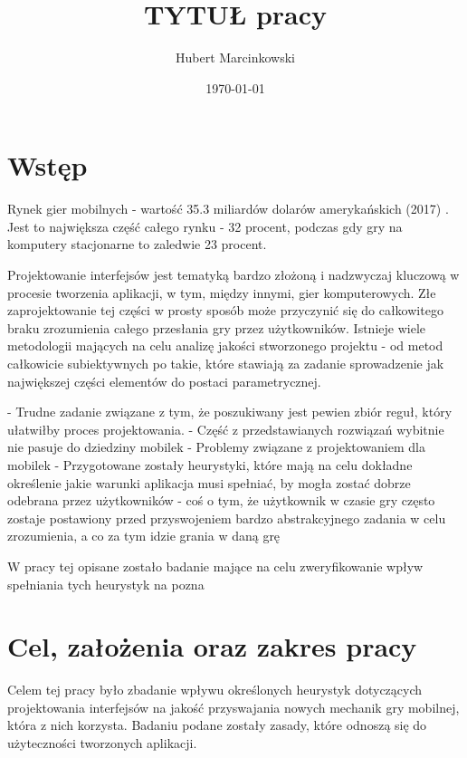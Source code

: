 \documentclass[a4paper,12pt,numbers=noenddot]{report}
\title{TYTUŁ pracy}
\date{\today}
\author{Hubert Marcinkowski}
\begin{document}
	\nocite{*}
	

	\newpage
	\tableofcontents
	\newpage
\chapter{Wstęp}
Rynek gier mobilnych - wartość 35.3 miliardów dolarów amerykańskich (2017) \cite{art_Market2017}. Jest to największa część całego rynku - 32 procent, podczas gdy gry na komputery stacjonarne to zaledwie 23 procent. 

Projektowanie interfejsów jest tematyką bardzo złożoną i nadzwyczaj kluczową w procesie tworzenia aplikacji, w tym, między innymi, gier komputerowych. Złe zaprojektowanie tej części w prosty sposób może przyczynić się do całkowitego braku zrozumienia całego przesłania gry przez użytkowników. Istnieje wiele metodologii mających na celu analizę jakości stworzonego projektu - od metod całkowicie subiektywnych po takie, które stawiają za zadanie sprowadzenie jak największej części elementów do postaci parametrycznej. 

- Trudne zadanie związane z tym, że poszukiwany jest pewien zbiór reguł, który ułatwiłby proces projektowania. 
- Część z przedstawianych rozwiązań wybitnie nie pasuje do dziedziny mobilek
- Problemy związane z projektowaniem dla mobilek
- Przygotowane zostały heurystyki, które mają na celu dokładne określenie jakie warunki aplikacja musi spełniać, by mogła zostać dobrze odebrana przez użytkowników
- coś o tym, że użytkownik w czasie gry często zostaje postawiony przed przyswojeniem bardzo abstrakcyjnego zadania w celu zrozumienia, a co za tym idzie grania w daną grę

W pracy tej opisane zostało badanie mające na celu zweryfikowanie wpływ spełniania tych heurystyk na pozna
\chapter{Cel, założenia oraz zakres pracy}
Celem tej pracy było zbadanie wpływu określonych heurystyk dotyczących projektowania interfejsów na jakość przyswajania nowych mechanik gry mobilnej, która z nich korzysta. Badaniu podane zostały zasady, które odnoszą się do użyteczności tworzonych aplikacji.
\end{document}
